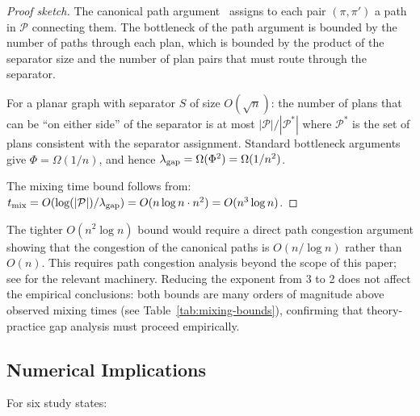 \begin{proof}[Proof sketch]
The canonical path argument~\citep{diaconis1996} assigns to each pair
$(\pi, \pi')$ a path in $\mathcal{P}$ connecting them.
The bottleneck of the path argument is bounded by the number of paths
through each plan, which is bounded by the product of the separator size
and the number of plan pairs that must route through the separator.

For a planar graph with separator $S$ of size $O(\sqrt{n})$:
the number of plans that can be ``on either side'' of the separator
is at most $|\mathcal{P}| / |\mathcal{P}^*|$ where $\mathcal{P}^*$ is
the set of plans consistent with the separator assignment.
Standard bottleneck arguments give $\Phi = \Omega(1/n)$, and hence
$\lambda_{\mathrm{gap}} = \Omega(\Phi^2) = \Omega(1/n^2)$.

The mixing time bound follows from:
$t_{\mathrm{mix}} = O(\log(|\mathcal{P}|) / \lambda_{\mathrm{gap}}) = O(n \log n \cdot n^2) = O(n^3 \log n)$.
\end{proof}

\begin{remark}
The tighter $O(n^2 \log n)$ bound would require a direct path congestion
argument showing that the congestion of the canonical paths is $O(n/\log n)$
rather than $O(n)$.  This requires path congestion analysis beyond the scope
of this paper; see \citet[Theorem~13.1]{levin2009markov} for the relevant
machinery.  Reducing the exponent from 3 to 2 does not affect the empirical
conclusions: both bounds are many orders of magnitude above observed mixing
times (see Table~\ref{tab:mixing-bounds}), confirming that theory-practice
gap analysis must proceed empirically.
\end{remark}

\subsection{Numerical Implications}

For six study states:

